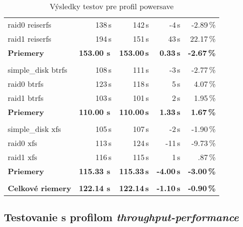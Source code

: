 {{{\begin{table}[H]
\begin{center}
\begin{tabular}{|l|r r r r|}
    raid0 reiserfs & 138\,s & 142\,s & -4\,s & -2.89\,\% \\
    raid1 reiserfs & 194\,s & 151\,s & 43\,s & 22.17\,\% \\
    \hline
    \textbf{Priemery} & \textbf{153.00 s}\,& \textbf{153.00\,s} & \textbf{0.33\,s} & \textbf{-2.67\,\%} \\
    \hline & \\[-1em]\hline
    simple\_disk btrfs & 108\,s & 111\,s & -3\,s & -2.77\,\% \\
    raid0 btrfs & 123\,s & 118\,s & 5\,s & 4.07\,\% \\
    raid1 btrfs & 103\,s & 101\,s & 2\,s & 1.95\,\% \\
    \hline
    \textbf{Priemery} & \textbf{110.00 s}\,& \textbf{110.00\,s} & \textbf{1.33\,s} & \textbf{1.67\,\%} \\
    \hline & \\[-1em]\hline
    simple\_disk xfs & 105\,s & 107\,s & -2\,s & -1.90\,\% \\
    raid0 xfs & 113\,s & 124\,s & -11\,s & -9.73\,\% \\
    raid1 xfs & 116\,s & 115\,s & 1\,s & .87\,\% \\
    \hline
    \textbf{Priemery} & \textbf{115.33 s}\,& \textbf{115.33\,s} & \textbf{-4.00\,s} & \textbf{-3.00\,\%} \\
    \hline & \\[-1em]\hline
    \textbf{Celkové riemery} & \textbf{122.14 s}\,& \textbf{122.14\,s} & \textbf{-1.10\,s} & \textbf{-0.90\,\%} \\
    \hline
\end{tabular}
\caption{Výsledky testov pre profil powersave}
\label{tab:results-xfs}
\end{center}
\end{table}

\subsection{Testovanie s profilom \emph{throughput-performance}}

}}}
